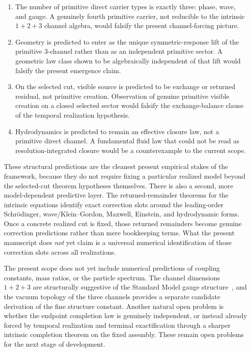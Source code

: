 \begin{enumerate}[label=(\roman*), itemsep=0.3em]
\item The number of primitive direct carrier types is exactly three: phase,
      wave, and gauge. A genuinely fourth primitive carrier, not reducible to
      the intrinsic \(1+2+3\) channel algebra, would falsify the present
      channel-forcing picture.
\item Geometry is predicted to enter as the unique symmetric-response lift of
      the primitive \(3\)-channel rather than as an independent primitive
      sector. A geometric law class shown to be algebraically independent of
      that lift would falsify the present emergence claim.
\item On the selected cut, visible source is predicted to be exchange or
      returned residual, not primitive creation. Observation of genuine
      primitive visible creation on a closed selected sector would falsify the
      exchange-balance clause of the temporal realization hypothesis.
\item Hydrodynamics is predicted to remain an effective closure law, not a
      primitive direct channel. A fundamental fluid law that could not be read
      as resolution-integrated closure would be a counterexample to the
      current scope.
\end{enumerate}

These structural predictions are the cleanest present empirical stakes of the
framework, because they do not require fixing a particular realized model
beyond the selected-cut theorem hypotheses themselves. There is also a second, more
model-dependent predictive layer. The returned-remainder theorems for the
intrinsic equations identify exact correction slots around the leading-order
Schr\"odinger, wave/Klein--Gordon, Maxwell, Einstein, and hydrodynamic forms.
Once a concrete realized cut is fixed, those returned remainders become
genuine correction predictions rather than mere bookkeeping terms. What the
present manuscript does \emph{not} yet claim is a universal numerical
identification of those correction slots across all realizations.

The present scope does not yet include numerical predictions of coupling
constants, mass ratios, or the particle spectrum. The channel dimensions
\(1{+}2{+}3\) are structurally suggestive of the Standard Model gauge
structure~\cite{PeskinSchroeder1995}, and the vacuum topology of the three
channels provides a separate candidate derivation of the fine structure
constant. Another natural open problem is whether the endpoint completion law
is genuinely independent, or instead already forced by temporal realization
and terminal exactification through a sharper intrinsic completion theorem on
the fixed assembly. These remain open problems for the next stage
of development.


